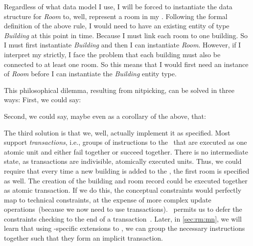 Regardless of what data model I use, I will be forced to instantiate the data structure for \emph{Room} to, well, represent a room in my \db.
Following the formal definition of the above rule, I would need to have an existing entity of type \emph{Building} at this point in time.
Because I must link each room to one building.
So I must first instantiate \emph{Building} and then I can instantiate \emph{Room}.
However, if I interpret my  strictly, I face the problem that each building must also be connected to at least one room.
So this means that I would first need an instance of \emph{Room} before I can instantiate the \emph{Building} entity type.

This philosophical dilemma, resulting from nitpicking, can be solved in three ways:
First, we could say:
\emph{}

Second, we could say, maybe even as a corollary of the above, that:
\emph{}

The third solution is that we, well, actually implement it as specified.
Most  support \emph{transactions}, i.e., groups of instructions to the \db\ that are executed as one atomic unit and either fail together or succeed together.
There is no intermediate state, as transactions are indivisible, atomically executed units.
Thus, we could require that every time a new building is added to the \db, the first room is specified as well.
The creation of the building and room record could be executed together as atomic transaction.
If we do this, the conceptual constraints would perfectly map to technical constraints, at the expense of more complex update operations~(because we now need to use transactions).
\postgresql\ permits us to defer the constraints checking to the end of a transaction~\cite{PGDG:PD:SC:SC,N2016SSFA:DC}.
Later, in \cref{sec:rm:mn}, we will learn that using \postgresql-specific extensions to \sql, we can group the necessary instructions together such that they form an implicit transaction.

